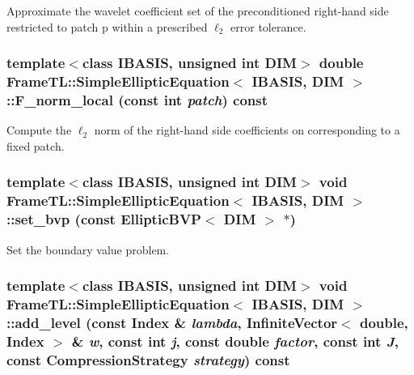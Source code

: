 Approximate the wavelet coefficient set of the preconditioned right-hand side restricted to patch p within a prescribed $\ell_2$ error tolerance. \hypertarget{classFrameTL_1_1SimpleEllipticEquation_dc2e6668d1d7f143d1ce1a88e18eddc8}{
\subsubsection[F\_\-norm\_\-local]{\setlength{\rightskip}{0pt plus 5cm}template$<$class IBASIS, unsigned int DIM$>$ double {\bf FrameTL::SimpleEllipticEquation}$<$ IBASIS, DIM $>$::F\_\-norm\_\-local (const int {\em patch}) const}}
\label{classFrameTL_1_1SimpleEllipticEquation_dc2e6668d1d7f143d1ce1a88e18eddc8}


Compute the $\ell_2$ norm of the right-hand side coefficients on corresponding to a fixed patch. \hypertarget{classFrameTL_1_1SimpleEllipticEquation_56298192b4c795a3e2923d3c9175116e}{
\subsubsection[set\_\-bvp]{\setlength{\rightskip}{0pt plus 5cm}template$<$class IBASIS, unsigned int DIM$>$ void {\bf FrameTL::SimpleEllipticEquation}$<$ IBASIS, DIM $>$::set\_\-bvp (const EllipticBVP$<$ DIM $>$ $\ast$)}}
\label{classFrameTL_1_1SimpleEllipticEquation_56298192b4c795a3e2923d3c9175116e}


Set the boundary value problem. \hypertarget{classFrameTL_1_1SimpleEllipticEquation_c21526eb37390ef77b7130e20c6ae000}{
\subsubsection[add\_\-level]{\setlength{\rightskip}{0pt plus 5cm}template$<$class IBASIS, unsigned int DIM$>$ void {\bf FrameTL::SimpleEllipticEquation}$<$ IBASIS, DIM $>$::add\_\-level (const {\bf Index} \& {\em lambda}, \/  InfiniteVector$<$ double, {\bf Index} $>$ \& {\em w}, \/  const int {\em j}, \/  const double {\em factor}, \/  const int {\em J}, \/  const CompressionStrategy {\em strategy}) const}}
\label{classFrameTL_1_1SimpleEllipticEquation_c21526eb37390ef77b7130e20c6ae000}


